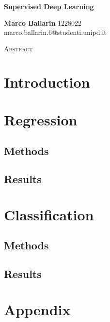 \documentclass{article}
\begin{document}
\begin{center}
    \huge
    \textbf{Supervised Deep Learning}  %
    
    \normalsize
    \vspace{0.4cm}
    \textbf{Marco Ballarin} 1228022  \\ %
    marco.ballarin.6@studenti.unipd.it

    \vspace{0.5cm}
    \Large
    \textsc{ Abstract}
    \begin{adjustwidth}{30pt}{30pt}
    \normalsize
    \vspace{0.3cm}
    
    \end{adjustwidth}
\end{center}
\vspace{0.2cm}

\section{Introduction \label{sec:int}}


\section{Regression \label{sec:reg}}

\subsection{Methods \label{sec:meth_reg}}


\subsection{Results \label{sec:res_reg}}


\section{Classification \label{sec:class}}
\subsection{Methods \label{sec:meth_class}}


\subsection{Results \label{sec:res_class}}


\section{Appendix \label{sec:app}}



\end{document}
